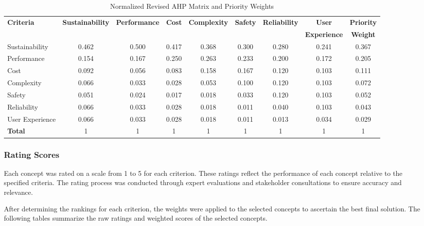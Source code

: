 \documentclass[12pt]{report}
\begin{document}
\begin{landscape}
\begin{table}[h!]
\centering
\caption{Normalized Revised AHP Matrix and Priority Weights}
\label{tab:normalized_revised_ahp}
\begin{tabular}{l c c c c c c c c}
\toprule
\textbf{Criteria} & \textbf{Sustainability} & \textbf{Performance} & \textbf{Cost} & \textbf{Complexity} & \textbf{Safety} & \textbf{Reliability} & \textbf{User} & \textbf{Priority} \\
 &  &  &  &  &  &  & \textbf{Experience} & \textbf{Weight} \\
\midrule
Sustainability & 0.462 & 0.500 & 0.417 & 0.368 & 0.300 & 0.280 & 0.241 & 0.367 \\
Performance & 0.154 & 0.167 & 0.250 & 0.263 & 0.233 & 0.200 & 0.172 & 0.205 \\
Cost & 0.092 & 0.056 & 0.083 & 0.158 & 0.167 & 0.120 & 0.103 & 0.111 \\
Complexity & 0.066 & 0.033 & 0.028 & 0.053 & 0.100 & 0.120 & 0.103 & 0.072 \\
Safety & 0.051 & 0.024 & 0.017 & 0.018 & 0.033 & 0.120 & 0.103 & 0.052 \\
Reliability & 0.066 & 0.033 & 0.028 & 0.018 & 0.011 & 0.040 & 0.103 & 0.043 \\
User Experience & 0.066 & 0.033 & 0.028 & 0.018 & 0.011 & 0.013 & 0.034 & 0.029 \\
\midrule
\textbf{Total} & 1 & 1 & 1 & 1 & 1 & 1 & 1 & 1 \\
\bottomrule
\end{tabular}
\end{table}
\end{landscape}

\subsubsection{Rating Scores}

Each concept was rated on a scale from 1 to 5 for each criterion. These ratings reflect the performance of each concept relative to the specified criteria. The rating process was conducted through expert evaluations and stakeholder consultations to ensure accuracy and relevance.

After determining the rankings for each criterion, the weights were applied to the selected concepts to ascertain the best final solution. The following tables summarize the raw ratings and weighted scores of the selected concepts.
\end{document}
